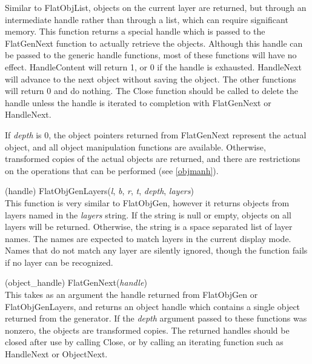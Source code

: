 \begin{description}
Similar to {\vt FlatObjList}, objects on the current layer are
returned, but through an intermediate handle rather than through a
list, which can require significant memory.  This function returns a
special handle which is passed to the {\vt FlatGenNext} function to
actually retrieve the objects.  Although this handle can be passed to
the generic handle functions, most of these functions will have no
effect.  {\vt HandleContent} will return 1, or 0 if the handle is
exhausted.  {\vt HandleNext} will advance to the next object without
saving the object.  The other functions will return 0 and do nothing. 
The {\vt Close} function should be called to delete the handle unless
the handle is iterated to completion with {\vt FlatGenNext} or {\vt
HandleNext}.

If {\it depth} is 0, the object pointers returned from {\vt
FlatGenNext} represent the actual object, and all object manipulation
functions are available.  Otherwise, transformed copies of the actual
objects are returned, and there are restrictions on the operations
that can be performed (see \ref{objmanh}).

\item{(handle) \vt FlatObjGenLayers({\it l\/}, {\it b\/}, {\it r\/},
   {\it t\/}, {\it depth}, {\it layers\/})}\\
This function is very similar to {\vt FlatObjGen}, however it returns
objects from layers named in the {\it layers} string.  If the string
is null or empty, objects on all layers will be returned.  Otherwise,
the string is a space separated list of layer names.  The names are
expected to match layers in the current display mode.  Names that do
not match any layer are silently ignored, though the function fails if
no layer can be recognized.

\item{(object\_handle) \vt FlatGenNext({\it handle\/})}\\
This takes as an argument the handle returned from {\vt FlatObjGen} or
{\vt FlatObjGenLayers}, and returns an object handle which contains a
single object returned from the generator.  If the {\it depth}
argument passed to these functions was nonzero, the objects are
transformed copies.  The returned handles should be closed after use
by calling {\vt Close}, or by calling an iterating function such as
{\vt HandleNext} or {\vt ObjectNext}.


\end{description}
